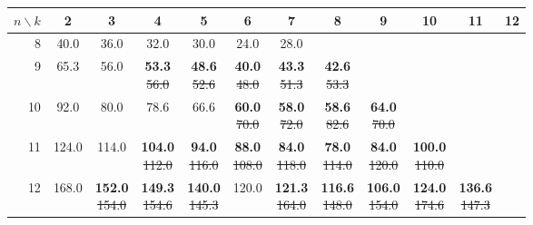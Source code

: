 \begin{tabular}{rccccccccccc}
\toprule
$n \backslash k$ & 2 & 3 & 4 & 5 & 6 & 7 & 8 & 9 & 10 & 11 & 12 \\
\midrule
8 & 40.0 & 36.0 & 32.0 & 30.0 & 24.0 & 28.0 &  &  &  &  &  \\[2pt]
9 & 65.3 & 56.0 & \shortstack{\textbf{53.3}\\{\tiny\sout{56.0}}} & \shortstack{\textbf{48.6}\\{\tiny\sout{52.6}}} & \shortstack{\textbf{40.0}\\{\tiny\sout{48.0}}} & \shortstack{\textbf{43.3}\\{\tiny\sout{51.3}}} & \shortstack{\textbf{42.6}\\{\tiny\sout{53.3}}} &  &  &  &  \\[2pt]
10 & 92.0 & 80.0 & 78.6 & 66.6 & \shortstack{\textbf{60.0}\\{\tiny\sout{70.0}}} & \shortstack{\textbf{58.0}\\{\tiny\sout{72.0}}} & \shortstack{\textbf{58.6}\\{\tiny\sout{82.6}}} & \shortstack{\textbf{64.0}\\{\tiny\sout{70.0}}} &  &  &  \\[2pt]
11 & 124.0 & 114.0 & \shortstack{\textbf{104.0}\\{\tiny\sout{112.0}}} & \shortstack{\textbf{94.0}\\{\tiny\sout{116.0}}} & \shortstack{\textbf{88.0}\\{\tiny\sout{108.0}}} & \shortstack{\textbf{84.0}\\{\tiny\sout{118.0}}} & \shortstack{\textbf{78.0}\\{\tiny\sout{114.0}}} & \shortstack{\textbf{84.0}\\{\tiny\sout{120.0}}} & \shortstack{\textbf{100.0}\\{\tiny\sout{110.0}}} &  &  \\[2pt]
12 & 168.0 & \shortstack{\textbf{152.0}\\{\tiny\sout{154.0}}} & \shortstack{\textbf{149.3}\\{\tiny\sout{154.6}}} & \shortstack{\textbf{140.0}\\{\tiny\sout{145.3}}} & 120.0 & \shortstack{\textbf{121.3}\\{\tiny\sout{164.0}}} & \shortstack{\textbf{116.6}\\{\tiny\sout{148.0}}} & \shortstack{\textbf{106.0}\\{\tiny\sout{154.0}}} & \shortstack{\textbf{124.0}\\{\tiny\sout{174.6}}} & \shortstack{\textbf{136.6}\\{\tiny\sout{147.3}}} &  \\[2pt]

\end{tabular}
